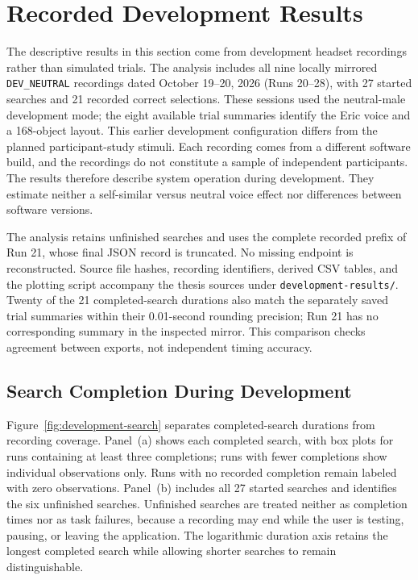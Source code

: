 \section{Recorded Development Results}
\label{sec:development-results}
The descriptive results in this section come from development headset recordings rather than simulated trials. The analysis includes all nine locally mirrored \texttt{DEV\_NEUTRAL} recordings dated October 19--20, 2026 (Runs 20--28), with 27 started searches and 21 recorded correct selections. These sessions used the neutral-male development mode; the eight available trial summaries identify the Eric voice and a 168-object layout. This earlier development configuration differs from the planned participant-study stimuli. Each recording comes from a different software build, and the recordings do not constitute a sample of independent participants. The results therefore describe system operation during development. They estimate neither a self-similar versus neutral voice effect nor differences between software versions.

The analysis retains unfinished searches and uses the complete recorded prefix of Run 21, whose final JSON record is truncated. No missing endpoint is reconstructed. Source file hashes, recording identifiers, derived CSV tables, and the plotting script accompany the thesis sources under \texttt{development-results/}. Twenty of the 21 completed-search durations also match the separately saved trial summaries within their 0.01-second rounding precision; Run 21 has no corresponding summary in the inspected mirror. This comparison checks agreement between exports, not independent timing accuracy.

\subsection{Search Completion During Development}
Figure~\ref{fig:development-search} separates completed-search durations from recording coverage. Panel~(a) shows each completed search, with box plots for runs containing at least three completions; runs with fewer completions show individual observations only. Runs with no recorded completion remain labeled with zero observations. Panel~(b) includes all 27 started searches and identifies the six unfinished searches. Unfinished searches are treated neither as completion times nor as task failures, because a recording may end while the user is testing, pausing, or leaving the application. The logarithmic duration axis retains the longest completed search while allowing shorter searches to remain distinguishable.

